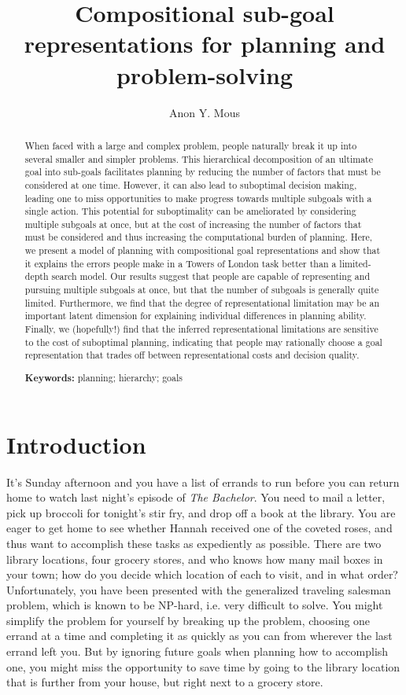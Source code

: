 \documentclass[10pt,letterpaper]{article}
\title{Compositional sub-goal representations for planning and problem-solving}
\author{Anon Y. Mous}
\begin{document}
\maketitle


\begin{abstract}
When faced with a large and complex problem, people naturally break it up into several smaller and simpler problems. This hierarchical decomposition of an ultimate goal into sub-goals facilitates planning by reducing the number of factors that must be considered at one time. However, it can also lead to suboptimal decision making, leading one to miss opportunities to make progress towards multiple subgoals with a single action. This potential for suboptimality can be ameliorated by considering multiple subgoals at once, but at the cost of increasing the number of factors that must be considered and thus increasing the computational burden of planning. Here, we present a model of planning with compositional goal representations and show that it explains the errors people make in a Towers of London task better than a limited-depth search model. Our results suggest that people are capable of representing and pursuing multiple subgoals at once, but that the number of subgoals is generally quite limited. Furthermore, we find that the degree of representational limitation may be an important latent dimension for explaining individual differences in planning ability. Finally, we (hopefully!) find that the inferred representational limitations are sensitive to the cost of suboptimal planning, indicating that people may rationally choose a goal representation that trades off between representational costs and decision quality.

\textbf{Keywords:} 
planning; hierarchy; goals
\end{abstract}


\section{Introduction}

It's Sunday afternoon and you have a list of errands to run before you can return home to watch last night's episode of \textit{The Bachelor}. You need to mail a letter, pick up broccoli for tonight's stir fry, and drop off a book at the library. You are eager to get home to see whether Hannah received one of the coveted roses, and thus want to accomplish these tasks as expediently as possible. There are two library locations, four grocery stores, and who knows how many mail boxes in your town; how do you decide which location of each to visit, and in what order? Unfortunately, you have been presented with the generalized traveling salesman problem, which is known to be NP-hard, i.e. very difficult to solve. You might simplify the problem for yourself by breaking up the problem, choosing one errand at a time and completing it as quickly as you can from wherever the last errand left you. But by ignoring future goals when planning how to accomplish one, you might miss the opportunity to save time by going to the library location that is further from your house, but right next to a grocery store.
\end{document}
